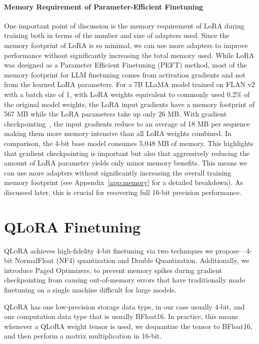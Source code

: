 \documentclass{article}
\newcommand{\method}{\textsc{QLoRA}\xspace}
\newcommand{\Pagedoptim}{Paged Optimizers\xspace}
\begin{document}
\paragraph{Memory Requirement of Parameter-Efficient Finetuning}
One important point of discussion is the memory requirement of LoRA during training both in terms of the number and size of adapters used. Since the memory footprint of LoRA is so minimal, we can use more adapters to improve performance without significantly increasing the total memory used.
While LoRA was designed as a Parameter Efficient Finetuning (PEFT) method, most of the memory footprint for LLM finetuning comes from activation gradients and not from the learned LoRA parameters. 
For a 7B LLaMA model trained on FLAN v2 with a batch size of 1, with LoRA weights equivalent to commonly used 0.2\% of the original model weights\citep{hu2021lora,liu2022few}, the LoRA input gradients have a memory footprint of 567 MB while the LoRA parameters take up only 26 MB. With gradient checkpointing~\citep{chen2016training}, the input gradients reduce to an average of 18 MB per sequence making them more memory intensive than all LoRA weights combined. In comparison, the 4-bit base model consumes 5,048 MB of memory.
This highlights that gradient checkpointing is important but also that aggressively reducing the amount of LoRA parameter yields only minor memory benefits. This means we can use more adapters without significantly increasing the overall training memory footprint (see Appendix~\ref{app:memory} for a detailed breakdown). 
As discussed later, this is crucial for recovering full 16-bit precision performance.

\section{\method Finetuning}

\method achieves high-fidelity 4-bit finetuning via two techniques we propose—4-bit NormalFloat (NF4) quantization and Double Quantization. Additionally, we introduce \Pagedoptim, to prevent memory spikes during gradient checkpointing from causing out-of-memory errors that have traditionally made finetuning on a single machine difficult for large models.

\method has one low-precision storage data type, in our case usually 4-bit, and one computation data type that is usually BFloat16. In practice, this means whenever a \method weight tensor is used, we dequantize the tensor to BFloat16, and then perform a matrix multiplication in 16-bit. 
\end{document}
